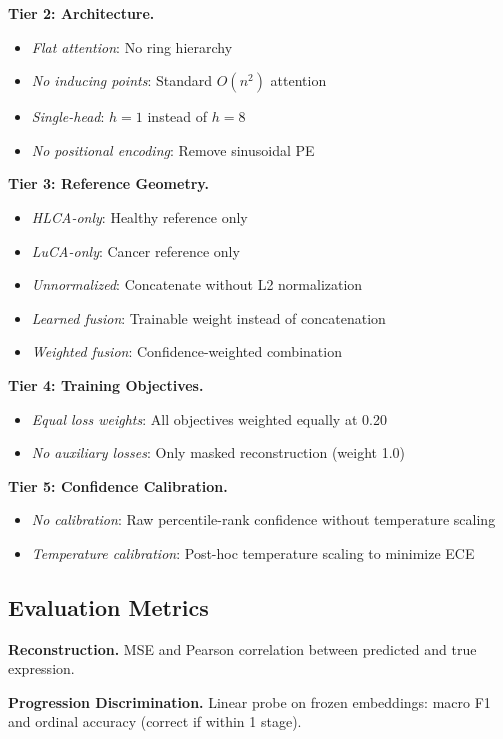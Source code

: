 \textbf{Tier 2: Architecture.}
\begin{itemize}
    \item \textit{Flat attention}: No ring hierarchy
    \item \textit{No inducing points}: Standard $O(n^2)$ attention
    \item \textit{Single-head}: $h=1$ instead of $h=8$
    \item \textit{No positional encoding}: Remove sinusoidal PE
\end{itemize}

\textbf{Tier 3: Reference Geometry.}
\begin{itemize}
    \item \textit{HLCA-only}: Healthy reference only
    \item \textit{LuCA-only}: Cancer reference only
    \item \textit{Unnormalized}: Concatenate without L2 normalization
    \item \textit{Learned fusion}: Trainable weight instead of concatenation
    \item \textit{Weighted fusion}: Confidence-weighted combination
\end{itemize}

\textbf{Tier 4: Training Objectives.}
\begin{itemize}
    \item \textit{Equal loss weights}: All objectives weighted equally at 0.20
    \item \textit{No auxiliary losses}: Only masked reconstruction (weight 1.0)
\end{itemize}

\textbf{Tier 5: Confidence Calibration.}
\begin{itemize}
    \item \textit{No calibration}: Raw percentile-rank confidence without temperature scaling
    \item \textit{Temperature calibration}: Post-hoc temperature scaling to minimize ECE
\end{itemize}

\subsection{Evaluation Metrics}

\textbf{Reconstruction.} MSE and Pearson correlation between predicted and true expression.

\textbf{Progression Discrimination.} Linear probe on frozen embeddings: macro F1 and ordinal accuracy (correct if within 1 stage).

